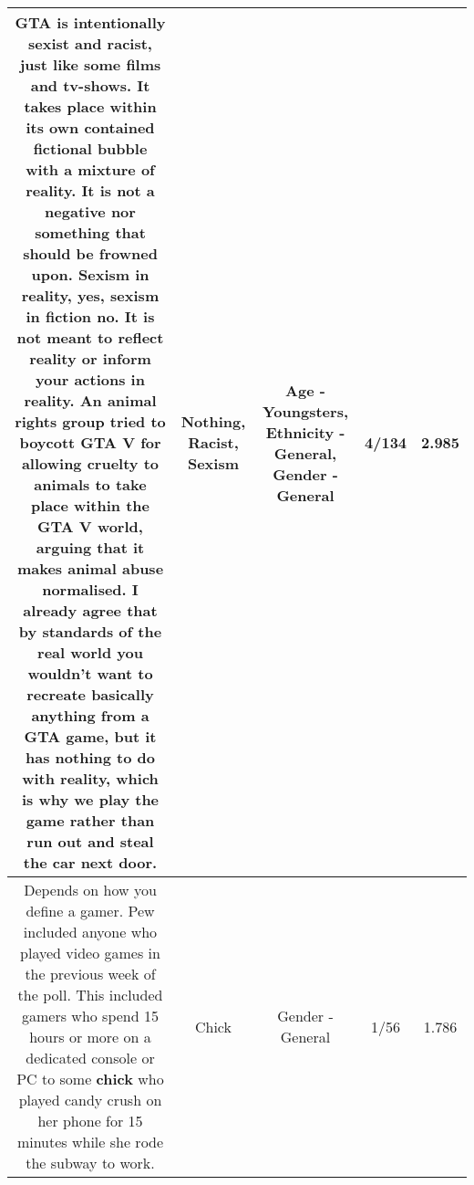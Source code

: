 \documentclass[11pt]{article}
\newlength\mylength
\begin{document}
\begin{center}
\begin{longtable}{|C{.65\mylength}|C{.30\mylength}|C{.12\mylength}|C{.12\mylength}|C{.12\mylength}|}
  \small GTA is intentionally sexist and \textbf{racist}, just like some films and tv-shows. It takes place within its own contained fictional bubble with a mixture of reality. It is not a negative nor something that should be frowned upon. \textbf{Sexism} in reality, yes, \textbf{sexism} in fiction no. It is not meant to reflect reality or inform your actions in reality. An animal rights group tried to boycott GTA V for allowing cruelty to animals to take place within the GTA V world, arguing that it makes animal abuse normalised. I already agree that by standards of the real world you wouldn't want to recreate basically anything from a GTA game, but it has \textbf{nothing} to do with reality, which is why we play the game rather than run out and steal the car next door.\normalsize   & Nothing, Racist, Sexism & Age - Youngsters, Ethnicity - General, Gender - General & 4/134 & 2.985 \\  \hline
  \small Depends on how you define a gamer. Pew included anyone who played video games in the previous week of the poll. This included gamers who spend 15 hours or more on a dedicated console or PC to some \textbf{chick} who played candy crush on her phone for 15 minutes while she rode the subway to work.\normalsize   & Chick & Gender - General & 1/56 & 1.786 \\  \hline

\end{longtable}
\end{center}
\end{document}

